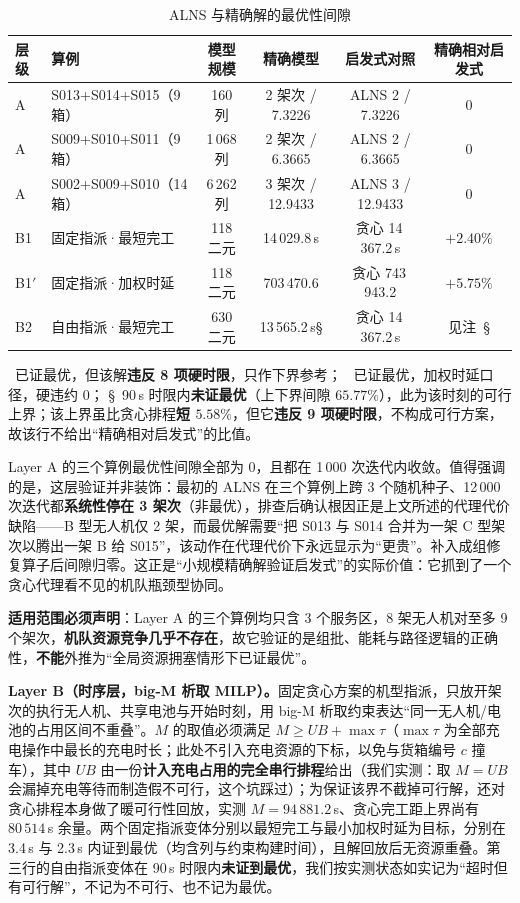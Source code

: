 \begin{table}[htbp]
	\caption{ALNS 与精确解的最优性间隙}
	\label{tab:q2-exact}
	\centering
	\footnotesize
	\setlength{\tabcolsep}{4pt}
	\begin{tabular}{llcccc}
		\toprule
		层级 & 算例 & 模型规模 & 精确模型 & 启发式对照 & 精确相对启发式 \\
		\midrule
		A & S013+S014+S015（9 箱） & 160 列 & 2 架次 / 7.3226 & ALNS 2 / 7.3226 & $0$ \\
		A & S009+S010+S011（9 箱） & 1\,068 列 & 2 架次 / 6.3665 & ALNS 2 / 6.3665 & $0$ \\
		A & S002+S009+S010（14 箱） & 6\,262 列 & 3 架次 / 12.9433 & ALNS 3 / 12.9433 & $0$ \\
		\addlinespace
		B1 & 固定指派·最短完工 & 118 二元 & 14\,029.8\,s\dag & 贪心 14\,367.2\,s & $+2.40\%$ \\
		B1$'$ & 固定指派·加权时延 & 118 二元 & 703\,470.6\ddag & 贪心 743\,943.2 & $+5.75\%$ \\
		B2 & 自由指派·最短完工 & 630 二元 & 13\,565.2\,s\S & 贪心 14\,367.2\,s & 见注~\S \\
		\bottomrule
	\end{tabular}

	\vspace{2pt}
	{\footnotesize \dag\ 已证最优，但该解\textbf{违反 8 项硬时限}，只作下界参考；\quad
	\ddag\ 已证最优，加权时延口径，硬违约 $0$；\quad
	\S\ 90\,s 时限内\textbf{未证最优}（上下界间隙 $65.77\%$），此为该时刻的可行上界；该上界虽比贪心排程\textbf{短 $5.58\%$}，但它\textbf{违反 9 项硬时限}，不构成可行方案，故该行不给出“精确相对启发式”的比值。}
\end{table}

Layer A 的三个算例最优性间隙全部为 $0$，且都在 1\,000 次迭代内收敛。值得强调的是，这层验证并非装饰：最初的 ALNS 在三个算例上跨 3 个随机种子、12\,000 次迭代都\textbf{系统性停在 3 架次}（非最优），排查后确认根因正是上文所述的代理代价缺陷——B 型无人机仅 2 架，而最优解需要“把 S013 与 S014 合并为一架 C 型架次以腾出一架 B 给 S015”，该动作在代理代价下永远显示为“更贵”。补入成组修复算子后间隙归零。这正是“小规模精确解验证启发式”的实际价值：它抓到了一个贪心代理看不见的机队瓶颈型协同。

\textbf{适用范围必须声明}：Layer A 的三个算例均只含 3 个服务区，8 架无人机对至多 9 个架次，\textbf{机队资源竞争几乎不存在}，故它验证的是组批、能耗与路径逻辑的正确性，\textbf{不能}外推为“全局资源拥塞情形下已证最优”。

\textbf{Layer B（时序层，big-M 析取 MILP）。}固定贪心方案的机型指派，只放开架次的执行无人机、共享电池与开始时刻，用 big-M 析取约束表达“同一无人机/电池的占用区间不重叠”\cite{grossmann2011generalized}。$M$ 的取值必须满足 $M\ge UB+\max\tau$（$\max\tau$ 为全部充电操作中最长的充电时长；此处不引入充电资源的下标，以免与货箱编号 $c$ 撞车），其中 $UB$ 由一份\textbf{计入充电占用的完全串行排程}给出（我们实测：取 $M=UB$ 会漏掉充电等待而制造假不可行，这个坑踩过）；为保证该界不截掉可行解，还对贪心排程本身做了暖可行性回放，实测 $M=94\,881.2$\,s、贪心完工距上界尚有 $80\,514$\,s 余量。两个固定指派变体分别以最短完工与最小加权时延为目标，分别在 3.4\,s 与 2.3\,s 内证到最优（均含列与约束构建时间），且解回放后无资源重叠。第三行的自由指派变体在 90\,s 时限内\textbf{未证到最优}，我们按实测状态如实记为“超时但有可行解”，不记为不可行、也不记为最优。

